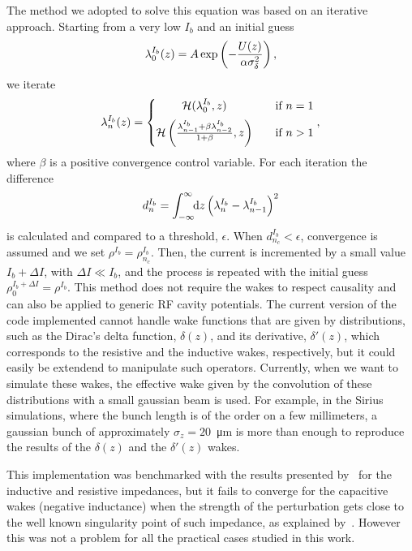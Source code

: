     The method we adopted to solve this equation was based on an iterative approach. Starting from a very low $I_b$ and an initial guess
    \begin{align}
        \lambda_0^{I_b}(z) = A\exp\left(-\frac{U(z)}{\alpha\sigma_\delta^2}\right),
    \end{align}
    we iterate
    \begin{align}
        \lambda_n^{I_b}(z) = \left\{
        \begin{matrix}
            \mathcal{H}(\lambda_0^{I_b},z)       & \quad \text{if } n = 1\\[2mm]
            \mathcal{H}\left(\frac{\lambda_{n-1}^{I_b} + \beta\lambda_{n-2}^{I_b}}{1+\beta},z\right) & \quad \text{if } n > 1
        \end{matrix}\right.,
    \end{align}
    where $\beta$ is a positive convergence control variable. For each iteration the difference
    \begin{align}
        d_n^{I_b} = \int_{-\infty}^{\infty}\!\!\text{d}z \left(\lambda_n^{I_b}-\lambda_{n-1}^{I_b}\right)^2
    \end{align}
    is calculated and compared to a threshold, $\epsilon$. When $d_{n_c}^{I_b}<\epsilon$, convergence is assumed and we set $\rho^{I_b} = \rho_{n_c}^{I_b}$. Then, the current is incremented by a small value $I_b + \Delta I$, with $\Delta I \ll I_b$, and the process is repeated with the initial guess $\rho_0^{I_b+\Delta I} = \rho^{I_b}$. This method does not require the wakes to respect causality and can also be applied to generic RF cavity potentials. The current version of the code implemented cannot handle wake functions that are given by distributions, such as the Dirac's delta function, $\delta(z)$, and its derivative, $\delta'(z)$, which corresponds to the resistive and the inductive wakes, respectively, but it could easily be extendend to manipulate such operators. Currently, when we want to simulate these wakes, the effective wake given by the convolution of these distributions with a small gaussian beam is used.
    For example, in the Sirius simulations, where the bunch length is of the order on a few millimeters, a gaussian bunch of approximately $\sigma_z=20$~\si{\micro\meter} is more than enough to reproduce the results of the $\delta(z)$ and the $\delta'(z)$ wakes.

    This implementation was benchmarked with the results presented by~ for the inductive and resistive impedances, but it fails to converge for the capacitive wakes (negative inductance) when the strength of the perturbation gets close to the well known singularity point of such impedance, as explained by~. However this was not a problem for all the practical cases studied in this work.

